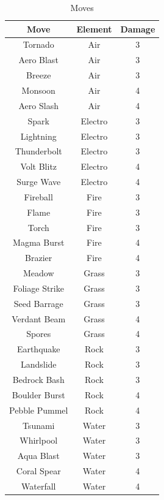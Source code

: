 \documentclass[12pt, a4paper]{report}
\theoremstyle{definition}
\begin{document}
\begin{table}[H]
    \begin{center}
    \begin{tabular}{| c | c | c |}
        \hline
        Move & Element & Damage \\
        \hline \hline
        Tornado & Air & 3 \\
        \hline
        Aero Blast & Air & 3 \\
        \hline
        Breeze & Air & 3 \\
        \hline
        Monsoon & Air & 4 \\
        \hline
        Aero Slash & Air & 4 \\
        \hline
        Spark & Electro & 3 \\
        \hline
        Lightning & Electro & 3 \\
        \hline
        Thunderbolt & Electro & 3 \\
        \hline
        Volt Blitz & Electro & 4 \\
        \hline
        Surge Wave & Electro & 4 \\
        \hline
        Fireball & Fire & 3 \\
        \hline
        Flame & Fire & 3 \\
        \hline
        Torch & Fire & 3 \\
        \hline
        Magma Burst & Fire & 4 \\
        \hline
        Brazier & Fire & 4 \\
        \hline
        Meadow & Grass & 3 \\
        \hline
        Foliage Strike & Grass & 3 \\
        \hline
        Seed Barrage & Grass & 3 \\
        \hline
        Verdant Beam & Grass & 4 \\
        \hline
        Spores & Grass & 4 \\
        \hline
        Earthquake & Rock & 3 \\
        \hline
        Landslide & Rock & 3 \\
        \hline
        Bedrock Bash & Rock & 3 \\
        \hline
        Boulder Burst & Rock & 4 \\
        \hline
        Pebble Pummel & Rock & 4 \\
        \hline
        Tsunami & Water & 3 \\
        \hline
        Whirlpool & Water & 3 \\
        \hline
        Aqua Blast & Water & 3 \\
        \hline
        Coral Spear & Water & 4 \\
        \hline
        Waterfall & Water & 4 \\
        \hline
    \end{tabular}
    \caption{\label{table:moves} Moves}
    \end{center}
\end{table}
\end{document}
